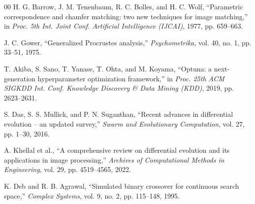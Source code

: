 \begin{thebibliography}{00}
 H. G. Barrow, J. M. Tenenbaum, R. C. Bolles, and H. C. Wolf,
``Parametric correspondence and chamfer matching: two new techniques for image matching,''
in \textit{Proc. 5th Int. Joint Conf. Artificial Intelligence (IJCAI)}, 1977, pp. 659--663.

 J. C. Gower,
``Generalized Procrustes analysis,''
\textit{Psychometrika}, vol. 40, no. 1, pp. 33--51, 1975.

 T. Akiba, S. Sano, T. Yanase, T. Ohta, and M. Koyama,
``Optuna: a next-generation hyperparameter optimization framework,'' in
\textit{Proc. 25th ACM SIGKDD Int. Conf. Knowledge Discovery \& Data Mining
(KDD)}, 2019, pp. 2623--2631.

 S. Das, S. S. Mullick, and P. N. Suganthan,
``Recent advances in differential evolution -- an updated survey,''
\textit{Swarm and Evolutionary Computation}, vol. 27, pp. 1--30, 2016.

 A. Khellal et al.,
``A comprehensive review on differential evolution and its applications in image
processing,'' \textit{Archives of Computational Methods in Engineering},
vol. 29, pp. 4519--4565, 2022.

 K. Deb and R. B. Agrawal,
``Simulated binary crossover for continuous search space,''
\textit{Complex Systems}, vol. 9, no. 2, pp. 115--148, 1995.

\end{thebibliography}
